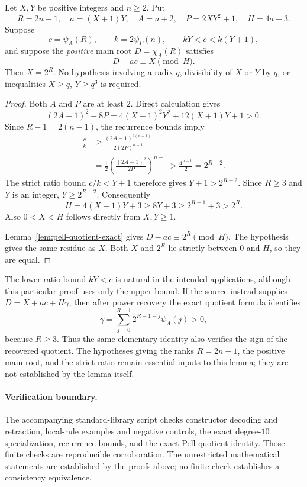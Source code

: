 \documentclass[11pt,a4paper]{article}
\theoremstyle{definition}
\begin{document}
\begin{auxsyntaxthm}
\label{thm:pell-power-recovery-clean}
Let $X,Y$ be positive integers and $n\ge2$.  Put
\[
 R=2n-1,\quad a=(X+1)Y,\quad A=a+2,\quad
 P=2XY^2+1,\quad H=4a+3.
\]
Suppose
\[
 c=\psi_A(R),\qquad k=2\psi_P(n),\qquad
 kY<c<k(Y+1),
\]
and suppose the \emph{positive} main root
$D=\chi_A(R)$ satisfies
\[
 D-ac\equiv X\pmod H.
\]
Then $X=2^R$.  No hypothesis involving a radix $q$, divisibility of $X$
or $Y$ by $q$, or inequalities $X\ge q$, $Y\ge q^3$ is required.
\end{auxsyntaxthm}
\begin{proof}
Both $A$ and $P$ are at least $2$.  Direct calculation gives
\[
 (2A-1)^2-8P
 =4(X-1)^2Y^2+12(X+1)Y+1>0.
\]
Since $R-1=2(n-1)$, the recurrence bounds imply
\begin{align*}
 \frac ck
 &\ge \frac{(2A-1)^{2(n-1)}}{2(2P)^{n-1}}\\
 &=\frac12\left(\frac{(2A-1)^2}{2P}\right)^{n-1}
 >\frac{4^{n-1}}2=2^{R-2}.
\end{align*}
The strict ratio bound $c/k<Y+1$ therefore gives
$Y+1>2^{R-2}$.  Since $R\ge3$ and $Y$ is an integer,
$Y\ge2^{R-2}$.  Consequently
\[
 H=4(X+1)Y+3\ge8Y+3\ge2^{R+1}+3>2^R.
\]
Also $0<X<H$ follows directly from $X,Y\ge1$.

Lemma~\ref{lem:pell-quotient-exact} gives
$D-ac\equiv2^R\pmod H$.  The hypothesis gives the same residue as $X$.
Both $X$ and $2^R$ lie strictly between $0$ and $H$, so they are equal.
\end{proof}

The lower ratio bound $kY<c$ is natural in the intended applications,
although this particular proof uses only the upper bound.  If the source
instead supplies $D=X+ac+H\gamma$, then after power recovery the exact
quotient formula identifies
\[
 \gamma=\sum_{j=0}^{R-1}2^{R-1-j}\psi_A(j)>0,
\]
because $R\ge3$.  Thus the same elementary identity also verifies the
sign of the recovered quotient.  The hypotheses giving the ranks
$R=2n-1$, the positive main root, and the strict ratio remain essential
inputs to this lemma; they are not established by the lemma itself.

\paragraph{Verification boundary.}
The accompanying standard-library script checks constructor decoding and
retraction, local-rule examples and negative controls, the exact
degree-$10$ specialization, recurrence bounds, and the exact Pell
quotient identity.  Those finite checks are reproducible corroboration.
The unrestricted mathematical statements are established by the proofs
above; no finite check establishes a consistency equivalence.
\end{document}

